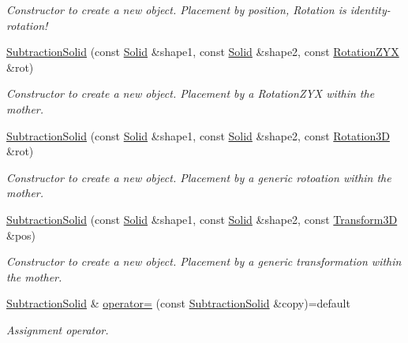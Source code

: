 \begin{DoxyCompactItemize}
\begin{DoxyCompactList}\small\item\em Constructor to create a new object. Placement by position, Rotation is identity-\/rotation! \end{DoxyCompactList}\item 
\hyperlink{class_d_d4hep_1_1_geometry_1_1_subtraction_solid_ac9c6a2de374c53eacf01eaa2ee759638}{Subtraction\+Solid} (const \hyperlink{namespace_d_d4hep_1_1_geometry_a83de90a8dcc7378ba47d54ef9a6a687b}{Solid} \&shape1, const \hyperlink{namespace_d_d4hep_1_1_geometry_a83de90a8dcc7378ba47d54ef9a6a687b}{Solid} \&shape2, const \hyperlink{namespace_d_d4hep_1_1_geometry_a24667b2b9c3cec3d5239828db4d52189}{Rotation\+Z\+YX} \&rot)
\begin{DoxyCompactList}\small\item\em Constructor to create a new object. Placement by a Rotation\+Z\+YX within the mother. \end{DoxyCompactList}\item 
\hyperlink{class_d_d4hep_1_1_geometry_1_1_subtraction_solid_a9ffb916760e748c1096ab8d765d7884a}{Subtraction\+Solid} (const \hyperlink{namespace_d_d4hep_1_1_geometry_a83de90a8dcc7378ba47d54ef9a6a687b}{Solid} \&shape1, const \hyperlink{namespace_d_d4hep_1_1_geometry_a83de90a8dcc7378ba47d54ef9a6a687b}{Solid} \&shape2, const \hyperlink{namespace_d_d4hep_1_1_geometry_a022fecb763315fa2bf39cbb648944a0e}{Rotation3D} \&rot)
\begin{DoxyCompactList}\small\item\em Constructor to create a new object. Placement by a generic rotoation within the mother. \end{DoxyCompactList}\item 
\hyperlink{class_d_d4hep_1_1_geometry_1_1_subtraction_solid_a3e6d305e752d6f429ddbe2f2a8a2f18d}{Subtraction\+Solid} (const \hyperlink{namespace_d_d4hep_1_1_geometry_a83de90a8dcc7378ba47d54ef9a6a687b}{Solid} \&shape1, const \hyperlink{namespace_d_d4hep_1_1_geometry_a83de90a8dcc7378ba47d54ef9a6a687b}{Solid} \&shape2, const \hyperlink{namespace_d_d4hep_1_1_geometry_aeb4c0356d12fd7be49a0aae50514e64b}{Transform3D} \&pos)
\begin{DoxyCompactList}\small\item\em Constructor to create a new object. Placement by a generic transformation within the mother. \end{DoxyCompactList}\item 
\hyperlink{class_d_d4hep_1_1_geometry_1_1_subtraction_solid}{Subtraction\+Solid} \& \hyperlink{class_d_d4hep_1_1_geometry_1_1_subtraction_solid_a72938e6ff2903a3d5ecad0b3a3d9fd29}{operator=} (const \hyperlink{class_d_d4hep_1_1_geometry_1_1_subtraction_solid}{Subtraction\+Solid} \&copy)=default
\begin{DoxyCompactList}\small\item\em Assignment operator. \end{DoxyCompactList}\end{DoxyCompactItemize}

